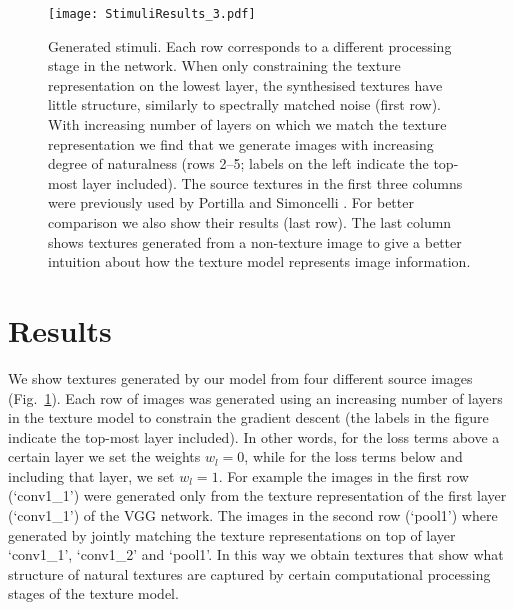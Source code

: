 \documentclass{article} %
\begin{document}
\begin{figure}[]
\begin{center}
\texttt{[image: StimuliResults\_3.pdf]}%
\end{center}
\caption{\label{generated}Generated stimuli. Each row corresponds to a different processing stage in the network. When only constraining the texture representation on the lowest layer, the synthesised textures have little structure, similarly to spectrally matched noise (first row). With increasing number of layers on which we match the texture representation we find that we generate images with increasing degree of naturalness (rows 2--5; labels on the left indicate the top-most layer included). The source textures in the first three columns were previously used by Portilla and Simoncelli \cite{portilla_parametric_2000}. For better comparison we also show their results (last row). The last column shows textures generated from a non-texture image to give a better intuition about how the texture model represents image information.}
\end{figure}

\section{Results}
We show textures generated by our model from four different source images (Fig.~\ref{generated}). Each row of images was generated using an increasing number of layers in the texture model to constrain the gradient descent (the labels in the figure indicate the top-most layer included). In other words, for the loss terms above a certain layer we set the weights $w_l=0$, while for the loss terms below and including that layer, we set $w_l=1$. For example the images in the first row (`conv1\_1') were generated only from the texture representation of the first layer (`conv1\_1') of the VGG network. The images in the second row (`pool1') where generated by jointly matching the texture representations on top of layer `conv1\_1', `conv1\_2' and `pool1'. In this way we obtain textures that show what structure of natural textures are captured by certain computational processing stages of the texture model.
\end{document}
